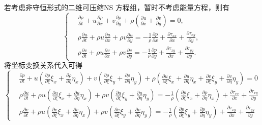 \documentclass[12pt]{article}
\begin{document}
若考虑非守恒形式的二维可压缩NS 方程组，暂时不考虑能量方程，则有
\begin{equation}
	\left\{\begin{aligned}
		 & \frac{\partial \rho}{\partial t}+u \frac{\partial \rho}{\partial x}+v \frac{\partial \rho}{\partial y}+\rho\left(\frac{\partial u}{\partial x}+\frac{\partial v}{\partial y}\right)=0,                                                    \\
		 & \rho \frac{\partial u}{\partial t}+\rho u \frac{\partial u}{\partial x}+\rho v \frac{\partial u}{\partial y}=-\frac{1}{\rho} \frac{\partial p}{\partial x}+\frac{\partial \tau_{x x}}{\partial x}+\frac{\partial \tau_{x y}}{\partial y}, \\
		 & \rho \frac{\partial v}{\partial t}+\rho u \frac{\partial v}{\partial x}+\rho v \frac{\partial v}{\partial y}=-\frac{1}{\rho} \frac{\partial p}{\partial y}+\frac{\partial \tau_{x y}}{\partial x}+\frac{\partial \tau_{y y}}{\partial y}.
	\end{aligned}\right.
\end{equation}
将坐标变换关系代入可得
\begin{equation}
	\left\{
	\begin{aligned}
		 & \frac{\partial \rho}{\partial t}+u\left(\frac{\partial \rho}{\partial \xi} \xi_{x}+\frac{\partial \rho}{\partial \eta} \eta_{x}\right)+v\left(\frac{\partial \rho}{\partial \xi} \xi_{y}+\frac{\partial \rho}{\partial \eta} \eta_{y}\right)+\rho\left(\frac{\partial u}{\partial \xi} \xi_{x}+\frac{\partial u}{\partial \eta} \eta_{x}+\frac{\partial v}{\partial \xi} \xi_{y}+\frac{\partial v}{\partial \eta} \eta_{y}\right)=0      \\
		 & \rho \frac{\partial u}{\partial t}+\rho u\left(\frac{\partial u}{\partial \xi} \xi_{x}+\frac{\partial u}{\partial \eta} \eta_{x}\right)+\rho v\left(\frac{\partial u}{\partial \xi} \xi_{y}+\frac{\partial u}{\partial \eta} \eta_{y}\right)=-\frac{1}{\rho}\left(\frac{\partial p}{\partial \xi} \xi_{x}+\frac{\partial p}{\partial \eta} \eta_{x}\right)+\frac{\partial \tau_{x x}}{\partial x}+\frac{\partial \tau_{x y}}{\partial y} \\
		 & \rho \frac{\partial v}{\partial t}+\rho u\left(\frac{\partial v}{\partial \xi} \xi_{x}+\frac{\partial v}{\partial \eta} \eta_{x}\right)+\rho v\left(\frac{\partial v}{\partial \xi} \xi_{y}+\frac{\partial v}{\partial \eta} \eta_{y}\right)=-\frac{1}{\rho}\left(\frac{\partial p}{\partial \xi} \xi_{y}+\frac{\partial p}{\partial \eta} \eta_{y}\right)+\frac{\partial \tau_{x y}}{\partial x}+\frac{\partial \tau_{y y}}{\partial y}
	\end{aligned}\right.
\end{equation}
\end{document}
